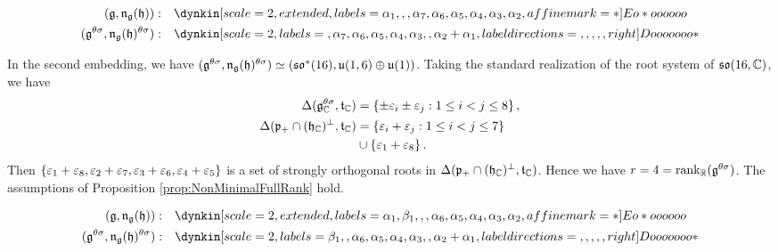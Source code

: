\begin{align*}
	(\lie{g}, \lieNorm_{\lie{g}}(\lie{h})): \quad & \dynkin[scale=2, extended, labels={\alpha_1, , , \alpha_7, \alpha_6, \alpha_5, \alpha_4, \alpha_3, \alpha_2}, affine mark=*]{E}{o*oooooo} \\
	(\lie{g}^{\theta\sigma}, \lieNorm_{\lie{g}}(\lie{h})^{\theta\sigma}): \quad & \dynkin[scale=2, labels={, \alpha_7, \alpha_6, \alpha_5, \alpha_4, \alpha_3, , \alpha_2+\alpha_1}, label directions={,,,,,right}]{D}{ooooooo*}
\end{align*}

In the second embedding, we have $(\mathfrak{g}^{\theta\sigma}, \mathfrak{n}_{\mathfrak{g}}(\mathfrak{h})^{\theta\sigma}) \simeq (\mathfrak{so}^*(16), \mathfrak{u}(1, 6) \oplus \mathfrak{u}(1))$.
Taking the standard realization of the root system of $\mathfrak{so}(16, \mathbb{C})$, we have
\begin{align*}
	\Delta(\mathfrak{g}_{\mathbb{C}}^{\theta\sigma}, \mathfrak{t}_{\mathbb{C}}) &= \left\{\pm \varepsilon_i \pm \varepsilon_j: 1\leq i < j \leq 8 \right\},\\
	\Delta(\mathfrak{p}_+ \cap (\mathfrak{h}_{\mathbb{C}})^\perp, \mathfrak{t}_{\mathbb{C}}) &= \left\{\varepsilon_i + \varepsilon_j: 1\leq i < j \leq 7 \right\} \\
	&\cup \left\{\varepsilon_1 + \varepsilon_8 \right\}.
\end{align*}
Then $\left\{\varepsilon_1 + \varepsilon_8, \varepsilon_2 + \varepsilon_7, \varepsilon_3 + \varepsilon_6, \varepsilon_4 + \varepsilon_5 \right\}$ is a set of strongly orthogonal roots in $\Delta(\mathfrak{p}_+ \cap (\mathfrak{h}_{\mathbb{C}})^\perp, \mathfrak{t}_{\mathbb{C}})$.
Hence we have $r = 4 = \operatorname{rank}_{\mathbb{R}}(\mathfrak{g}^{\theta\sigma})$.
The assumptions of Proposition \ref{prop:NonMinimalFullRank} hold.

\begin{align*}
	(\lie{g}, \lieNorm_{\lie{g}}(\lie{h})): \quad & \dynkin[scale=2, extended, labels={\alpha_1, \beta_1, , , \alpha_6, \alpha_5, \alpha_4, \alpha_3, \alpha_2}, affine mark=*]{E}{o*oooooo} \\
	(\lie{g}^{\theta\sigma}, \lieNorm_{\lie{g}}(\lie{h})^{\theta\sigma}): \quad & \dynkin[scale=2, labels={\beta_1, , \alpha_6, \alpha_5, \alpha_4, \alpha_3, , \alpha_2+\alpha_1}, label directions={,,,,,right}]{D}{ooooooo*}
\end{align*}

